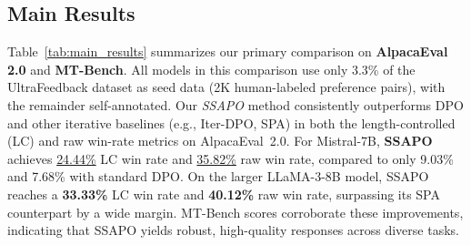 \begin{table*}[ht]
\centering
\caption{\textbf{Comparison with different variants of Mistral.} Evaluation results on AlpacaEval 2.0 and MT-Bench with different variants of Mistral-7B-v0.1. The best scores are highlighted with bold. The baseline results are from \cite{Kim2025Spread} and \citep{dubois2024length}.}
\label{tab:mistral_variants}
\end{table*}

\subsection{Main Results}
\label{subsec:main_results}

Table~\ref{tab:main_results} summarizes our primary comparison on \textbf{AlpacaEval 2.0} and \textbf{MT-Bench}. All models in this comparison use only 3.3\% of the UltraFeedback dataset as seed data (2K human-labeled preference pairs), with the remainder self-annotated. Our \emph{SSAPO} method consistently outperforms DPO and other iterative baselines (e.g., Iter-DPO, SPA) in both the length-controlled (LC) and raw win-rate metrics on AlpacaEval~2.0. For Mistral-7B, \textbf{SSAPO} achieves \underline{24.44\%} LC win rate and \underline{35.82\%} raw win rate, compared to only 9.03\% and 7.68\% with standard DPO. On the larger LLaMA-3-8B model, SSAPO reaches a \textbf{33.33\%} LC win rate and \textbf{40.12\%} raw win rate, surpassing its SPA counterpart by a wide margin. MT-Bench scores corroborate these improvements, indicating that SSAPO yields robust, high-quality responses across diverse tasks.  %

